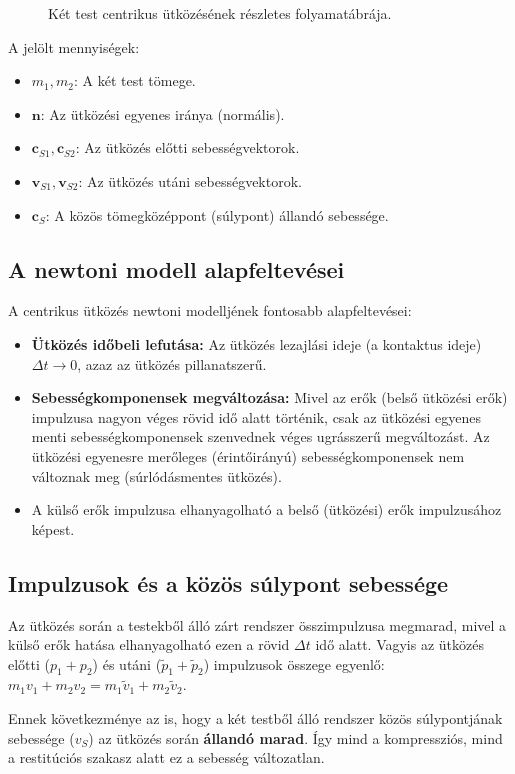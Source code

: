 \begin{figure}[H]
{
    }
    \caption{Két test centrikus ütközésének részletes folyamatábrája.}
\end{figure}
A jelölt mennyiségek:
\begin{itemize}
    \item $m_1, m_2$: A két test tömege.
    \item $\mathbf{n}$: Az ütközési egyenes iránya (normális).
    \item $\mathbf{c}_{S1}, \mathbf{c}_{S2}$: Az ütközés előtti sebességvektorok.
    \item $\mathbf{v}_{S1}, \mathbf{v}_{S2}$: Az ütközés utáni sebességvektorok.
    \item $\mathbf{c}_S$: A közös tömegközéppont (súlypont) állandó sebessége.
\end{itemize}

\subsection*{A newtoni modell alapfeltevései}
A centrikus ütközés newtoni modelljének fontosabb alapfeltevései:
\begin{itemize}
    \item \textbf{Ütközés időbeli lefutása:} Az ütközés lezajlási ideje (a kontaktus ideje) $\Delta t \to 0$, azaz az ütközés pillanatszerű.
    \item \textbf{Sebességkomponensek megváltozása:} Mivel az erők (belső ütközési erők) impulzusa nagyon véges rövid idő alatt történik, csak az ütközési egyenes menti sebességkomponensek szenvednek véges ugrásszerű megváltozást. Az ütközési egyenesre merőleges (érintőirányú) sebességkomponensek nem változnak meg (súrlódásmentes ütközés).
    \item A külső erők impulzusa elhanyagolható a belső (ütközési) erők impulzusához képest.
\end{itemize}

\newpage
\subsection*{Impulzusok és a közös súlypont sebessége}
Az ütközés során a testekből álló zárt rendszer összimpulzusa megmarad, mivel a külső erők hatása elhanyagolható ezen a rövid $\Delta t$ idő alatt. Vagyis az ütközés előtti ($p_1 + p_2$) és utáni ($\tilde{p}_1 + \tilde{p}_2$) impulzusok összege egyenlő:  $m_1 v_1 + m_2 v_2 = m_1 \tilde{v}_1 + m_2 \tilde{v}_2$. 

Ennek következménye az is, hogy a két testből álló rendszer közös súlypontjának sebessége ($v_S$) az ütközés során \textbf{állandó marad}. Így mind a kompressziós, mind a restitúciós szakasz alatt ez a sebesség változatlan.
